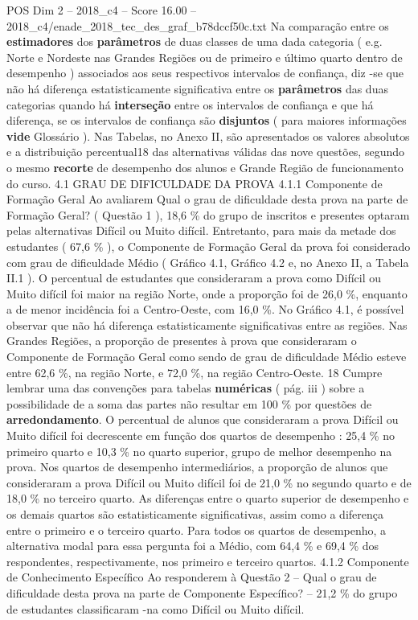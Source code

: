 \begin{textsample}{POS Dim 2 – 2018\_c4 – Score 16.00 – 2018\_c4/enade\_2018\_tec\_des\_graf\_b78dccf50c.txt}
Na comparação entre os \textbf{estimadores} dos \textbf{parâmetros} de duas classes de uma dada categoria ( e.g.
Norte e Nordeste nas Grandes Regiões ou de primeiro e último quarto dentro de desempenho ) associados aos seus respectivos intervalos de confiança, diz -se que não há diferença estatisticamente significativa entre os \textbf{parâmetros} das duas categorias quando há \textbf{interseção} entre os intervalos de confiança e que há diferença, se os intervalos de confiança são \textbf{disjuntos} ( para maiores informações \textbf{vide} Glossário ).
Nas Tabelas, no Anexo II, são apresentados os valores absolutos e a distribuição percentual18 das alternativas válidas das nove questões, segundo o mesmo \textbf{recorte} de desempenho dos alunos e Grande Região de funcionamento do curso. 4.1 GRAU DE DIFICULDADE DA PROVA 4.1.1 Componente de Formação Geral Ao avaliarem Qual o grau de dificuldade desta prova na parte de Formação Geral? ( Questão 1 ), 18,6 \% do grupo de inscritos e presentes optaram pelas alternativas Difícil ou Muito difícil.
Entretanto, para mais da metade dos estudantes ( 67,6 \% ), o Componente de Formação Geral da prova foi considerado com grau de dificuldade Médio ( Gráfico 4.1, Gráfico 4.2 e, no Anexo II, a Tabela II.1 ).
O percentual de estudantes que consideraram a prova como Difícil ou Muito difícil foi maior na região Norte, onde a proporção foi de 26,0 \%, enquanto a de menor incidência foi a Centro-Oeste, com 16,0 \%.
No Gráfico 4.1, é possível observar que não há diferença estatisticamente significativas entre as regiões.
Nas Grandes Regiões, a proporção de presentes à prova que consideraram o Componente de Formação Geral como sendo de grau de dificuldade Médio esteve entre 62,6 \%, na região Norte, e 72,0 \%, na região Centro-Oeste. 18 Cumpre lembrar uma das convenções para tabelas \textbf{numéricas} ( pág. iii ) sobre a possibilidade de a soma das partes não resultar em 100 \% por questões de \textbf{arredondamento}.
O percentual de alunos que consideraram a prova Difícil ou Muito difícil foi decrescente em função dos quartos de desempenho : 25,4 \% no primeiro quarto e 10,3 \% no quarto superior, grupo de melhor desempenho na prova.
Nos quartos de desempenho intermediários, a proporção de alunos que consideraram a prova Difícil ou Muito difícil foi de 21,0 \% no segundo quarto e de 18,0 \% no terceiro quarto.
As diferenças entre o quarto superior de desempenho e os demais quartos são estatisticamente significativas, assim como a diferença entre o primeiro e o terceiro quarto.
Para todos os quartos de desempenho, a alternativa modal para essa pergunta foi a Médio, com 64,4 \% e 69,4 \% dos respondentes, respectivamente, nos primeiro e terceiro quartos. 4.1.2 Componente de Conhecimento Específico Ao responderem à Questão 2 – Qual o grau de dificuldade desta prova na parte de Componente Específico? – 21,2 \% do grupo de estudantes classificaram -na como Difícil ou Muito difícil.

\end{textsample}
